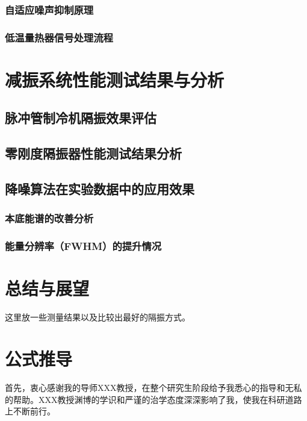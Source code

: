 \documentclass[type=master]{fduthesis}
\begin{document}
\subsection{自适应噪声抑制原理}
\subsection{低温量热器信号处理流程}



\chapter{减振系统性能测试结果与分析}
\section{脉冲管制冷机隔振效果评估}
\section{零刚度隔振器性能测试结果分析}
\section{降噪算法在实验数据中的应用效果}
\subsection{本底能谱的改善分析}
\subsection{能量分辨率（FWHM）的提升情况}



\chapter{总结与展望}
这里放一些测量结果以及比较出最好的隔振方式。





\appendix

\chapter{公式推导}

\backmatter




\begin{acknowledgements}
首先，衷心感谢我的导师XXX教授，在整个研究生阶段给予我悉心的指导和无私的帮助。XXX教授渊博的学识和严谨的治学态度深深影响了我，使我在科研道路上不断前行。
\end{acknowledgements}
\end{document}

